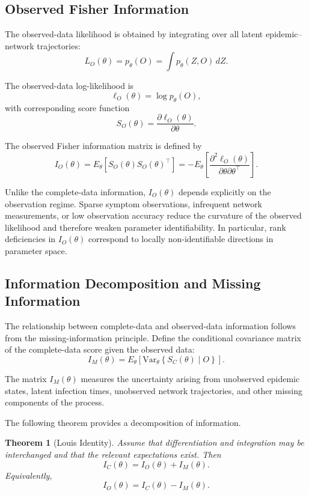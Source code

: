 \documentclass[10pt]{article}
\newtheorem{theorem}{Theorem}
\begin{document}
\subsection{Observed Fisher Information}

The observed-data likelihood is obtained by integrating over all latent epidemic--network trajectories:
\[
L_O(\theta)
=
p_\theta(O)
=
\int p_\theta(Z,O)\,dZ.
\]

The observed-data log-likelihood is
\[
\ell_O(\theta)
=
\log p_\theta(O),
\]
with corresponding score function
\[
S_O(\theta)
=
\frac{\partial \ell_O(\theta)}
{\partial\theta}.
\]

The observed Fisher information matrix is defined by
\[
I_O(\theta)
=
E_\theta
\left[
S_O(\theta)S_O(\theta)^\top
\right]
=
-
E_\theta
\left[
\frac{\partial^2\ell_O(\theta)}
{\partial\theta\partial\theta^\top}
\right].
\]

Unlike the complete-data information, $I_O(\theta)$ depends explicitly on the observation regime. Sparse symptom observations, infrequent network measurements, or low observation accuracy reduce the curvature of the observed likelihood and therefore weaken parameter identifiability. In particular, rank deficiencies in $I_O(\theta)$ correspond to locally non-identifiable directions in parameter space.

\subsection{Information Decomposition and Missing Information}

The relationship between complete-data and observed-data information follows from the missing-information principle. Define the conditional covariance matrix of the complete-data score given the observed data:
\[
I_M(\theta)
=
E_\theta
\left[
\mathrm{Var}_\theta
\left\{
S_C(\theta)\mid O
\right\}
\right].
\]

The matrix $I_M(\theta)$ measures the uncertainty arising from unobserved epidemic states, latent infection times, unobserved network trajectories, and other missing components of the process.

The following theorem provides a decomposition of information.

\begin{theorem}[Louis Identity]
Assume that differentiation and integration may be interchanged and that the relevant expectations exist. Then
\[
I_C(\theta)
=
I_O(\theta)
+
I_M(\theta).
\]
Equivalently,
\[
I_O(\theta)
=
I_C(\theta)-I_M(\theta).
\]
\end{theorem}
\end{document}
